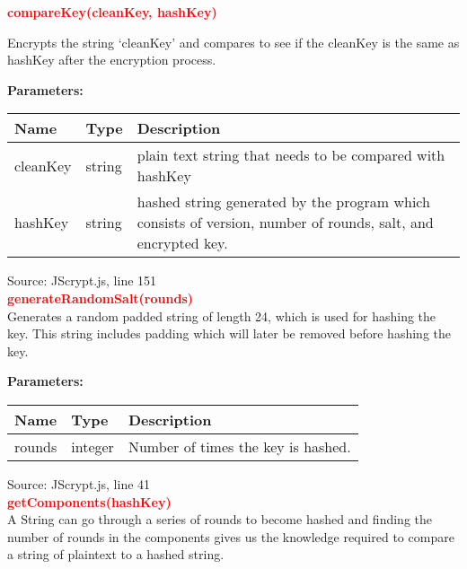 \documentclass[12pt]{article}
\begin{document}
\textcolor{red}{\textbf{compareKey(cleanKey, hashKey)}}

\noindent Encrypts the string `cleanKey' and compares to see if the cleanKey is the same as hashKey after the encryption process.

\noindent\textbf{Parameters:}

\begin{table}[H]
\centering
\label{tab:table3}
      \begin{tabular}{ | p{4cm} | p{4cm} | p{9cm} | }
        \hline
            \textbf{Name} & \textbf{Type} & \textbf{Description} \\
        \hline
          cleanKey & string & plain text string that needs to be compared with hashKey  \\
        \hline
          hashKey & string & hashed string generated by the program which consists of version, number of rounds, salt, and encrypted key. \\
       \hline
      \end{tabular}
  \end{table}

Source: JScrypt.js, line 151 \\

\noindent\textbf{\textcolor{red}{generateRandomSalt(rounds)}} \\
\noindent Generates a random padded string of length 24, which is used for hashing the key. This string includes padding which will later be removed before hashing the key.

\noindent\textbf{Parameters:}
\begin{table}[H]
\centering
\label{tab:table4}
      \begin{tabular}{ | p{4cm} | p{4cm} | p{9cm} | }
        \hline
            \textbf{Name} & \textbf{Type} & \textbf{Description} \\
        \hline
          rounds & integer & Number of times the key is hashed.  \\
       \hline
      \end{tabular}
  \end{table}
Source: JScrypt.js, line 41 \\


\noindent\textbf{\textcolor{red}{getComponents(hashKey)}} \\

A String can go through a series of rounds to become hashed and finding the number of rounds in the components gives us the knowledge required to compare a string of plaintext to a hashed string.
\end{document}
